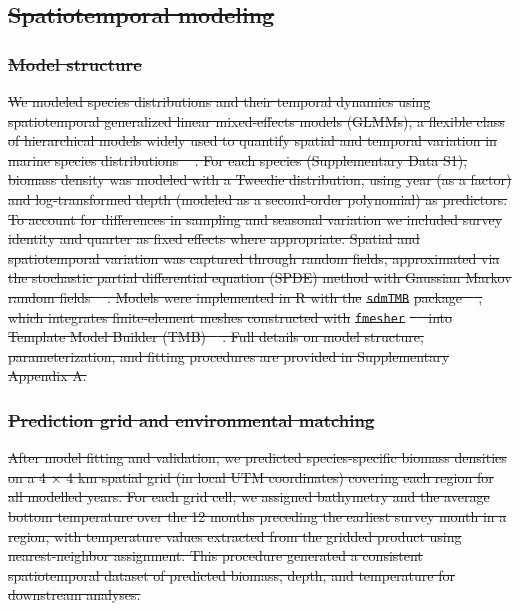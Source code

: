 \documentclass[9pt,twocolumn,twoside]{pnas-new}
\providecommand{\DIFdel}[1]{{\protect\color{red}\sout{#1}}} %
\begin{document}
{%
\subsection*{\DIFdel{Spatiotemporal modeling}}%

\subsubsection*{\DIFdel{Model structure}} 
\DIFdel{We modeled species distributions and their temporal dynamics using spatiotemporal generalized linear mixed-effects models (GLMMs), a flexible class of hierarchical models widely used to quantify spatial and temporal variation in marine species distributions \mbox{%
\citep{thorson_geostatistical_2015, thorson_model-based_2016}}\hskip0pt%
. For each species (Supplementary Data S1), biomass density was modeled with a Tweedie distribution, using year (as a factor) and log-transformed depth (modeled as a second-order polynomial) as predictors. To account for differences in sampling and seasonal variation we included survey identity and quarter as fixed effects where appropriate. Spatial and spatiotemporal variation was captured through random fields, approximated via the stochastic partial differential equation (SPDE) method with Gaussian Markov random fields \mbox{%
\citep{lindgren_explicit_2011}}\hskip0pt%
. Models were implemented in R with the }\texttt{\DIFdel{sdmTMB}} %
\DIFdel{package \mbox{%
\citep{sdmTMB2025}}\hskip0pt%
, which integrates finite-element meshes constructed with }\texttt{\DIFdel{fmesher}} %
\DIFdel{\mbox{%
\citep{lindgren_fmesher_2025} }\hskip0pt%
into Template Model Builder (TMB) \mbox{%
\citep{kristensen_tmb_2016}}\hskip0pt%
. Full details on model structure, parameterization, and fitting procedures are provided in Supplementary Appendix A.
}%

\subsubsection*{\DIFdel{Prediction grid and environmental matching}} 
\DIFdel{After model fitting and validation, we predicted species-specific biomass densities on a 4 × 4 km spatial
grid (in local UTM coordinates) covering each region for all modelled years. For each grid cell, we assigned bathymetry and the average bottom temperature over the 12 months preceding the earliest survey month in a region, with temperature values extracted from the gridded product using nearest-neighbor assignment. This procedure generated a consistent spatiotemporal dataset of predicted biomass, depth, and temperature for downstream analyses.
}%

}
\end{document}
